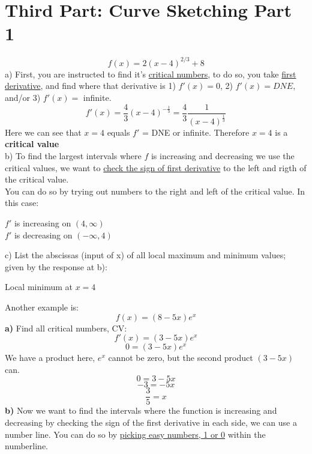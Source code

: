\documentclass[12pt, letterpaper]{article}
\begin{document}
\section{Third Part: Curve Sketching Part 1}
\[f(x)=2(x-4)^{2/3}+8\]
a) First, you are instructed to find it's \underline{critical numbers}, to do so, you take \underline{first derivative}, and find where that derivative is 1) \(f'(x)=0\), 2) \(f'(x)=DNE\), and/or 3) \(f'(x)=\) infinite.
\[f'(x)=\frac{4}{3}(x-4)^{-\frac{1}{3}} = \frac{4}{3} \frac{1}{(x-4)^\frac{1}{3}}\]
Here we can see that \(x=4\) equals \(f'\) = DNE or infinite. Therefore \(x=4\) is a \textbf{critical value}\\
\newline
b) To find the largest intervals where \(f\) is increasing and decreasing we use the critical values, we want to \underline{check the sign of first derivative} to the left and rigth of the critical value.\\
\newline
You can do so by trying out numbers to the right and left of the critical value. In this case:
\begin{center}
    \(f'\) is increasing on \((4,\infty)\)\\
    \(f'\) is decreasing on \((-\infty, 4)\)
\end{center}
c) List the abscissas (input of x) of all local maximum and minimum values; given by the response at b):
\begin{center}
    Local minimum at \(x=4\)
\end{center}
Another example is: 
\[f(x)=(8-5x)e^x\]
\textbf{a)} Find all critical numbers, CV:
\[f'(x)=(3-5x)e^x\]
\[0=(3-5x)e^x\]
We have a product here, \(e^x\) cannot be zero, but the second product \((3-5x)\) can.
\[0=3-5x\]
\[-3=-5x\]
\[\frac{3}{5}=x\]
\textbf{b)} Now we want to find the intervals where the function is increasing and decreasing by checking the sign of the first derivative in each side, we can use a number line. You can do so by \underline{picking easy numbers, 1 or 0} within the numberline.\\
\newline
\begin{center}
\end{center}
\end{document}
